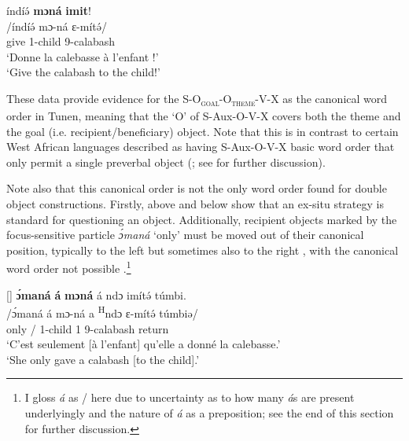 \documentclass[output=paper,colorlinks,citecolor=brown
]{langscibook}
\begin{document}
\z

\ea
\label{givecalchild}
\glll
{\db}índíə́ \textbf{mɔná} \textbf{imit}! \\
/índíə́ mɔ-ná ɛ-mítə́/ \\
{\db}give 1-child 9-calabash \\
\glt
`Donne la calebasse à l'enfant !' \\ `Give the calabash to the child!' \jambox*{[JO 1594] }

\z

These data provide evidence for the  S-O\textsubscript{\textsc{goal}}-O\textsubscript{\textsc{theme}}-V-X as the canonical word order in Tunen, meaning that the `O' of S-Aux-O-V-X covers both the theme and the goal (i.e. recipient/beneficiary) object. Note that this is in contrast to certain West African languages described as having S-Aux-O-V-X basic word order that only permit a single preverbal object (\citealt{GenslerGüldemann2003, Creissels2005}; see \citealt[Chapter 6]{KerrFut} for further discussion).

Note also that this canonical order is not the only word order found for double object constructions. Firstly,  above and  below show that an ex-situ strategy is standard for questioning an object. Additionally, recipient objects marked by the focus-sensitive particle \textit{ɔ́maná} `only' must be moved out of their canonical position, typically to the left  but sometimes also to the right , with the canonical word order not possible .\footnote{I gloss \textit{á} as \COP/\PREP{} here due to uncertainty as to how many \textit{á}s are present underlyingly and the nature of \textit{á} as a preposition; see the end of this section for further discussion.}

\ea \label{onlyset2}
\ea
[]{
\label{onlyset.d}
\glll
{\db}\textbf{ɔ́maná} \textbf{á} \textbf{mɔná} á ndɔ imítə́ túmbi. \\
/ɔ́maná á mɔ-ná a \textsuperscript{H}ndɔ ɛ-mítə́ túmbiə/ \\
{\db}only \COP/\PREP{} 1-child 1\SM{} \PRS{} 9-calabash return \\
\glt
‘C'est seulement [à l'enfant]\textsubscript{\FOC{}} qu'elle a donné la calebasse.' \\ `She only gave a calabash [to the child]\textsubscript{\FOC{}}.' \jambox*{[JO 1590] }
}
\end{document}
